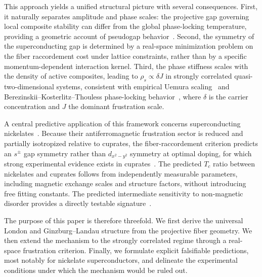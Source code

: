   This approach yields a unified structural picture with several consequences.
  First, it naturally separates amplitude and phase scales:
  the projective gap governing local composite stability
  can differ from the global phase-locking temperature,
  providing a geometric account of pseudogap behavior~\cite{Timusk1999Pseudogap}.
  Second, the symmetry of the superconducting gap
  is determined by a real-space minimization problem
  on the fiber raccordement cost under lattice constraints,
  rather than by a specific momentum-dependent interaction kernel.
  Third, the phase stiffness scales with the density of active composites,
  leading to $\rho_s \propto \delta J$ in strongly correlated quasi-two-dimensional systems,
  consistent with empirical Uemura scaling~\cite{Uemura1989Scaling}
  and Berezinskii--Kosterlitz--Thouless phase-locking behavior~\cite{BKT1973},
  where $\delta$ is the carrier concentration
  and $J$ the dominant frustration scale.

  A central predictive application of this framework
  concerns superconducting nickelates~\cite{Wang2025NickelateReview}.
  Because their antiferromagnetic frustration sector
  is reduced and partially isotropized relative to cuprates,
  the fiber-raccordement criterion predicts
  an $s^\pm$ gap symmetry rather than
  $d_{x^2-y^2}$ symmetry at optimal doping,
  for which strong experimental evidence exists in cuprates~\cite{Tsuei2000Dwave}.
  The predicted $T_c$ ratio between nickelates and cuprates
  follows from independently measurable parameters,
  including magnetic exchange scales and structure factors,
  without introducing free fitting constants.
  The predicted intermediate sensitivity to non-magnetic disorder
  provides a directly testable signature~\cite{Cheng2024NickelateDwave}.

  The purpose of this paper is therefore threefold.
  We first derive the universal London and Ginzburg--Landau structure
  from the projective fiber geometry.
  We then extend the mechanism to the strongly correlated regime
  through a real-space frustration criterion.
  Finally, we formulate explicit falsifiable predictions,
  most notably for nickelate superconductors,
  and delineate the experimental conditions under which
  the mechanism would be ruled out.

